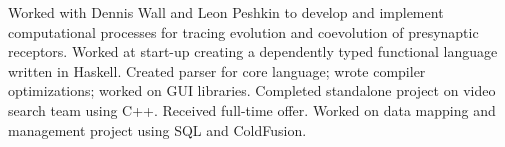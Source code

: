   {Worked with Dennis Wall and Leon Peshkin to develop and implement computational processes for tracing evolution and coevolution of presynaptic receptors.}
  {}{Worked at start-up creating a dependently typed functional language written in Haskell.  Created parser for core language; wrote compiler optimizations; worked on GUI libraries.}
  {Completed standalone project on video search team using C++.  Received full-time offer.}
  {}{Worked on data mapping and management project using SQL and ColdFusion.}
